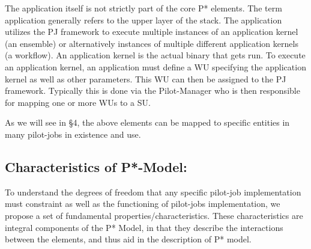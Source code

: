\documentclass[conference,final]{IEEEtran}
\newcommand{\upp}{\vspace*{-0.5em}}
\begin{document}
The application itself is not strictly part of the core P* elements. The term
application generally refers to the upper layer of the stack. The application
utilizes the PJ framework to execute multiple instances of an application kernel
(an ensemble) or alternatively instances of multiple different application
kernels (a workflow). An application kernel is the actual binary that gets run.
To execute an application kernel, an application must define a WU specifying the
application kernel as well as other parameters. This WU can then be assigned to
the PJ framework. Typically this is done via the Pilot-Manager who is then 
responsible for mapping one or more WUs to a SU.

	
As we will see in \S4, the above elements can be mapped to specific
entities in many pilot-jobs in existence and use.

 

% 
% 


\subsection{Characteristics of P*-Model:\upp\upp}
\label{sec:p_star_elements}

To understand the degrees of freedom that any specific pilot-job
implementation must constraint as well as the functioning of
pilot-jobs implementation, we propose a set of fundamental
properties/characteristics. These characteristics are integral
components of the P* Model, in that they describe the interactions
between the elements, and thus aid in the description of P*
model. 

\end{document}
